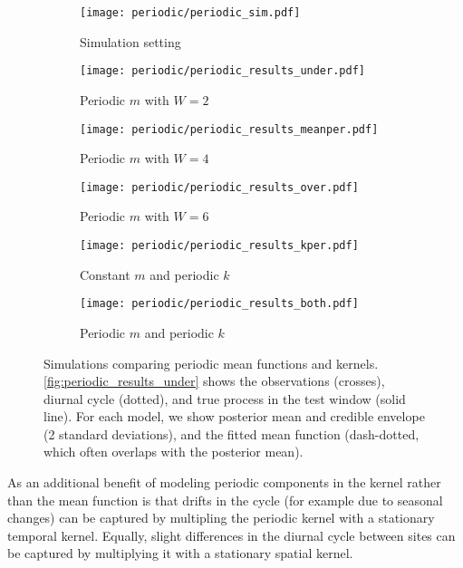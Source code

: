 \begin{figure}
    \centering
    \begin{subfigure}[t]{0.32\textwidth}
    \texttt{[image: periodic/periodic\_sim.pdf]}
    \caption{Simulation setting}
    \label{fig:periodic_sim}
    \end{subfigure}
    \begin{subfigure}[t]{0.32\textwidth}
    \texttt{[image: periodic/periodic\_results\_under.pdf]}
    \caption{Periodic $m$ with $W=2$}
    \label{fig:periodic_results_under}
    \end{subfigure}
    \begin{subfigure}[t]{0.32\textwidth}
    \texttt{[image: periodic/periodic\_results\_meanper.pdf]}
    \caption{Periodic $m$ with $W=4$}
    \label{fig:periodic_results_meanper}
    \end{subfigure}
    \begin{subfigure}[t]{0.32\textwidth}
    \texttt{[image: periodic/periodic\_results\_over.pdf]}
    \caption{Periodic $m$ with $W=6$}
    \label{fig:periodic_results_over}
    \end{subfigure}
    \begin{subfigure}[t]{0.32\textwidth}
    \texttt{[image: periodic/periodic\_results\_kper.pdf]}
    \caption{Constant $m$ and periodic $k$}
    \label{fig:periodic_results_kper}
    \end{subfigure}
    \begin{subfigure}[t]{0.32\textwidth}
    \texttt{[image: periodic/periodic\_results\_both.pdf]}
    \caption{Periodic $m$ and periodic $k$}
    \label{fig:periodic_results_both}
    \end{subfigure}
\caption{\label{fig:periodic_results}
    Simulations comparing periodic mean functions and kernels.
    \autoref{fig:periodic_results_under} shows the observations (crosses), diurnal cycle (dotted),
    and true process in the test window (solid line).
    For each model, we show posterior mean and credible envelope (2 standard deviations),
    and the fitted mean function (dash-dotted, which often overlaps with the posterior mean).
}
\end{figure}

As an additional benefit of modeling periodic components in the kernel rather than the mean function is that drifts in the cycle (for example due to seasonal changes)
can be captured by multipling the periodic kernel with a stationary temporal kernel.
Equally, slight differences in the diurnal cycle between sites can be captured by multiplying it with a stationary spatial kernel.

